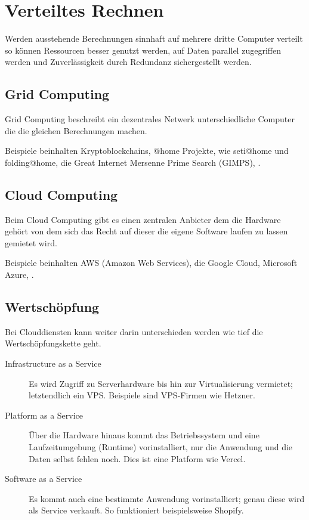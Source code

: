 \documentclass{article}
\begin{document}
\section{Verteiltes Rechnen}
Werden ausstehende Berechnungen sinnhaft auf mehrere dritte Computer verteilt so können Ressourcen besser genutzt werden, auf Daten parallel zugegriffen werden und Zuverlässigkeit durch Redundanz sichergestellt werden.

\subsection{Grid Computing}
Grid Computing beschreibt ein dezentrales Netwerk unterschiedliche Computer die die gleichen Berechnungen machen.

Beispiele beinhalten Kryptoblockchains, @home Projekte, wie seti@home und folding@home, die Great Internet Mersenne Prime Search (GIMPS), \usw.

\subsection{Cloud Computing}
Beim Cloud Computing gibt es einen zentralen Anbieter dem die Hardware gehört von dem sich das Recht auf dieser die eigene Software laufen zu lassen gemietet wird.

Beispiele beinhalten AWS (Amazon Web Services), die Google Cloud, Microsoft Azure, \usw.

\subsection{Wertschöpfung}
Bei Clouddiensten kann weiter darin unterschieden werden wie tief die Wertschöpfungskette geht.
\begin{description}
 \item[Infrastructure as a Service] Es wird Zugriff zu Serverhardware bis hin zur Virtualisierung vermietet; letztendlich ein VPS. Beispiele sind VPS-Firmen wie Hetzner.
 \item[Platform as a Service] Über die Hardware hinaus kommt das Betriebssystem und eine Laufzeitumgebung (Runtime) vorinstalliert, nur die Anwendung und die Daten selbst fehlen noch. Dies ist \zb eine Platform wie Vercel.
 \item[Software as a Service] Es kommt auch eine bestimmte Anwendung vorinstalliert; genau diese wird als Service verkauft. So funktioniert beispielsweise Shopify.
\end{description}
\end{document}
